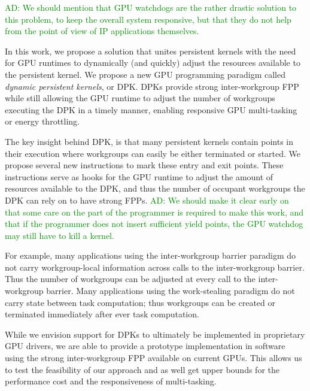 \documentclass[nocopyrightspace]{sigplanconf-pldi16}
\newcommand{\ADComment}[1]{\textcolor{green}{AD: #1}}
\begin{document}
\ADComment{We should mention that GPU watchdogs are the rather drastic solution to this problem, to keep the overall system responsive, but that they do not help from the point of view of IP applications themselves.}

In this work, we propose a solution that unites persistent kernels
with the need for GPU runtimes to dynamically (and quickly) adjust the
resources available to the persistent kernel. We propose a new GPU
programming paradigm called \emph{dynamic persistent kernels}, or
DPK. DPKs provide strong inter-workgroup FPP while still allowing the
GPU runtime to adjust the number of workgroups executing the DPK in a
timely manner, enabling responsive GPU multi-tasking or energy
throttling.

The key insight behind DPK, is that many persistent kernels contain
points in their execution where workgroups can easily be either
terminated or started. We propose several new instructions to mark
these entry and exit points. These instructions serve as hooks for the
GPU runtime to adjust the amount of resources available to the DPK,
and thus the number of occupant workgroups the DPK can rely on to have
strong FPPs. \ADComment{We should make it clear early on that some care on the part of the programmer is required to make this work, and that if the programmer does not insert sufficient yield points, the GPU watchdog may still have to kill a kernel.}

For example, many applications using the inter-workgroup barrier
paradigm do not carry workgroup-local information across calls to the
inter-workgroup barrier. Thus the number of workgroups can be adjusted
at every call to the inter-workgroup barrier. Many applications using
the work-stealing paradigm do not carry state between task
computation; thus workgroups can be created or terminated immediately
after ever task computation.

While we envision support for DPKs to ultimately be implemented in
proprietary GPU drivers, we are able to provide a prototype
implementation in software using the strong inter-workgroup FPP
available on current GPUs. This allows us to test the feasibility of
our approach and as well get upper bounds for the performance cost and
the responsiveness of multi-tasking.
\end{document}
